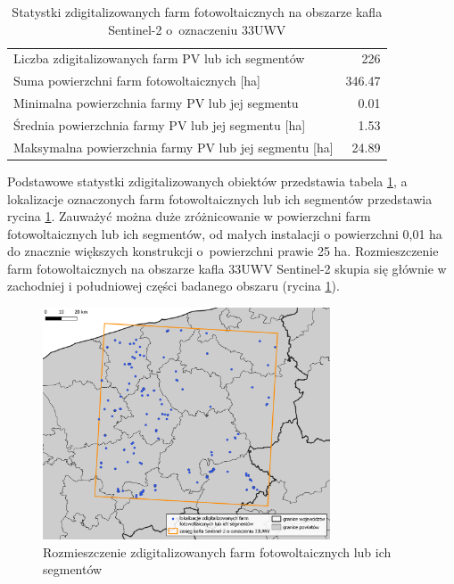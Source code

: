 \documentclass{amuthesis}
\begin{document}
\hypertarget{tbl-tabela-digitizing-results}{}
\begin{table}
\caption{\label{tbl-tabela-digitizing-results}Statystki zdigitalizowanych farm fotowoltaicznych na obszarze kafla
Sentinel-2 o~oznaczeniu 33UWV }\tabularnewline

\centering
\begin{tabular}{lr}
\toprule
Liczba zdigitalizowanych farm PV lub ich segmentów & 226\\
Suma powierzchni farm fotowoltaicznych [ha] & 346.47\\
Minimalna powierzchnia farmy PV lub jej segmentu & 0.01\\
Średnia powierzchnia farmy PV lub jej segmentu [ha] & 1.53\\
Maksymalna powierzchnia farmy PV lub jej segmentu [ha] & 24.89\\
\bottomrule
\end{tabular}
\end{table}

Podstawowe statystki zdigitalizowanych obiektów przedstawia tabela
\ref{tbl-tabela-digitizing-results}, a lokalizacje oznaczonych farm
fotowoltaicznych lub ich segmentów przedstawia rycina
\ref{fig-rycina-spatial-distribution-pv}. Zauważyć można duże
zróżnicowanie w powierzchni farm fotowoltaicznych lub ich segmentów, od
małych instalacji o powierzchni 0,01 ha do znacznie większych
konstrukcji o~powierzchni prawie 25 ha. Rozmieszczenie farm
fotowoltaicznych na obszarze kafla 33UWV Sentinel-2 skupia się głównie w
zachodniej i południowej części badanego obszaru (rycina
\ref{fig-rycina-spatial-distribution-pv}).

\begin{figure}[H]

{\centering \includegraphics[width=0.76\textwidth,height=\textheight]{figures/farmy2.png}

}

\caption{\label{fig-rycina-spatial-distribution-pv}Rozmieszczenie
zdigitalizowanych farm fotowoltaicznych lub ich segmentów}

\end{figure}
\end{document}
